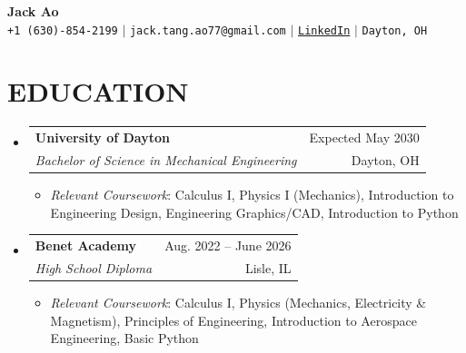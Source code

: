\documentclass[letterpaper,11pt]{article}
\makeatletter
\newcommand{\resumeItem}[1]{
  \item\small{
    {#1 \vspace{-1pt}}
  }
}
\newcommand{\resumeSubheading}[4]{
  \vspace{-1pt}\item
    \begin{tabular*}{\textwidth}[t]{l@{\extracolsep{\fill}}r}
      \textbf{#1} & {\color{dark-grey}\small #2}\vspace{1pt}\\ %
      \textit{#3} & {\color{dark-grey} \small #4}\\ %
    \end{tabular*}\vspace{-4pt}
}
\newcommand{\resumeSubHeadingListStart}{\begin{itemize}[leftmargin=0in, label={}]}
\newcommand{\resumeSubHeadingListEnd}{\end{itemize}}
\newcommand{\resumeItemListStart}{\begin{itemize}}
\newcommand{\resumeItemListEnd}{\end{itemize}\vspace{0pt}}
\makeatother
\begin{document}
\begin{center}
    \textbf{\Huge Jack Ao} \\ \vspace{5pt}
    \small \faPhone* \texttt{+1 (630)-854-2199} \hspace{1pt} $|$
    \hspace{1pt} \faEnvelope \hspace{2pt} \texttt{jack.tang.ao77@gmail.com} \hspace{1pt} $|$ 
     \hspace{1pt} \faLinkedin \hspace{2pt} \href{https://www.linkedin.com/in/jack-ao-8122aa356/}{\texttt{LinkedIn}} \hspace{1pt} $|$
    \hspace{1pt} \faMapMarker* \hspace{2pt}\texttt{Dayton, OH}
    \\ \vspace{-3pt}
\end{center}

\section {EDUCATION}
  \resumeSubHeadingListStart
    \resumeSubheading
      {University of Dayton}{Expected May 2030}
      {Bachelor of Science in Mechanical Engineering}{Dayton, OH}
      \resumeItemListStart
        \resumeItem{\textit{Relevant Coursework}: Calculus I, Physics I (Mechanics), Introduction to Engineering Design, Engineering Graphics/CAD, Introduction to Python}
      \resumeItemListEnd
  \resumeSubheading 
  {Benet Academy}{Aug. 2022 -- June 2026}
  {High School Diploma}{Lisle, IL}
 \resumeItemListStart 
    \resumeItem{\textit{Relevant Coursework}: Calculus I, Physics (Mechanics, Electricity \& Magnetism), Principles of Engineering, Introduction to Aerospace Engineering, Basic Python}
 \resumeItemListEnd
\resumeSubHeadingListEnd

\end{document}
